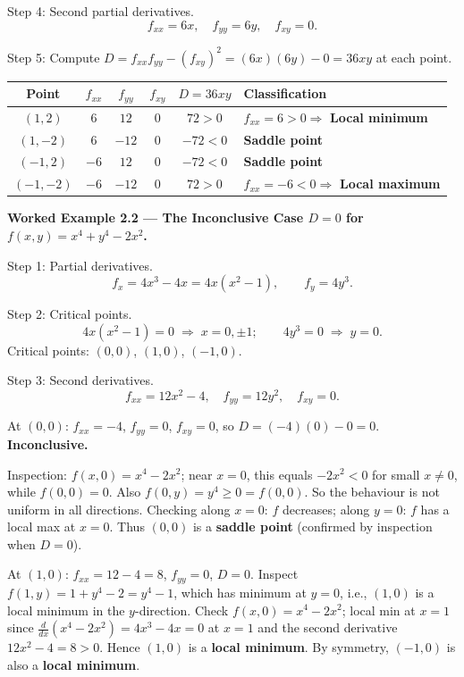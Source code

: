 \documentclass[12pt,a4paper]{article}
\begin{document}
Step 4: Second partial derivatives.
\[
  f_{xx} = 6x, \quad f_{yy} = 6y, \quad f_{xy} = 0.
\]

Step 5: Compute $D = f_{xx}f_{yy} - (f_{xy})^{2} = (6x)(6y) - 0 = 36xy$ at each point.

\begin{center}
\begin{tabular}{@{}cccccl@{}}
\toprule
Point & $f_{xx}$ & $f_{yy}$ & $f_{xy}$ & $D = 36xy$ & Classification \\
\midrule
$(1,2)$   & $6$  & $12$ & $0$ & $72 > 0$  & $f_{xx} = 6 > 0 \Rightarrow$ \textbf{Local minimum} \\
$(1,-2)$  & $6$  & $-12$& $0$ & $-72 < 0$ & \textbf{Saddle point} \\
$(-1,2)$  & $-6$ & $12$ & $0$ & $-72 < 0$ & \textbf{Saddle point} \\
$(-1,-2)$ & $-6$ & $-12$& $0$ & $72 > 0$  & $f_{xx} = -6 < 0 \Rightarrow$ \textbf{Local maximum} \\
\bottomrule
\end{tabular}
\end{center}

\medskip
\textbf{Worked Example 2.2 --- The Inconclusive Case $D = 0$ for $f(x,y) = x^{4} + y^{4} - 2x^{2}$.}

Step 1: Partial derivatives.
\[
  f_x = 4x^{3} - 4x = 4x(x^{2}-1), \qquad f_y = 4y^{3}.
\]

Step 2: Critical points.
\[
  4x(x^{2}-1) = 0 \;\Rightarrow\; x = 0, \pm 1; \qquad 4y^{3} = 0 \;\Rightarrow\; y = 0.
\]
Critical points: $(0,0)$, $(1,0)$, $(-1,0)$.

Step 3: Second derivatives.
\[
  f_{xx} = 12x^{2} - 4, \quad f_{yy} = 12y^{2}, \quad f_{xy} = 0.
\]

At $(0,0)$: $f_{xx} = -4$, $f_{yy} = 0$, $f_{xy} = 0$, so $D = (-4)(0) - 0 = 0$. \textbf{Inconclusive.}

Inspection: $f(x,0) = x^{4} - 2x^{2}$; near $x=0$, this equals $-2x^{2} < 0$ for small $x \neq 0$, while $f(0,0) = 0$. Also $f(0,y) = y^{4} \geq 0 = f(0,0)$. So the behaviour is not uniform in all directions. Checking along $x=0$: $f$ decreases; along $y=0$: $f$ has a local max at $x=0$. Thus $(0,0)$ is a \textbf{saddle point} (confirmed by inspection when $D=0$).

At $(1,0)$: $f_{xx} = 12-4 = 8$, $f_{yy} = 0$, $D = 0$. Inspect $f(1,y) = 1 + y^{4} - 2 = y^{4} - 1$, which has minimum at $y = 0$, i.e., $(1,0)$ is a local minimum in the $y$-direction. Check $f(x,0) = x^{4} - 2x^{2}$; local min at $x = 1$ since $\frac{d}{dx}(x^{4}-2x^{2}) = 4x^{3} - 4x = 0$ at $x=1$ and the second derivative $12x^{2}-4 = 8 > 0$. Hence $(1,0)$ is a \textbf{local minimum}. By symmetry, $(-1,0)$ is also a \textbf{local minimum}.
\end{document}

